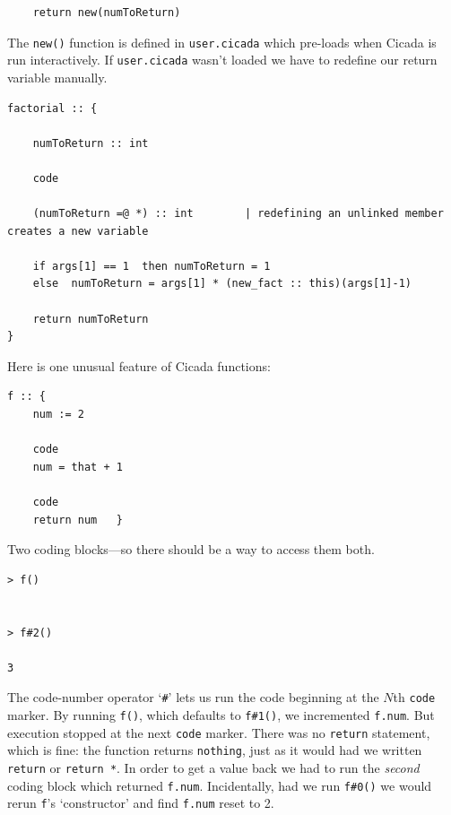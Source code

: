 \documentclass{article}
\newenvironment{code}{
       \begin{list}{}{
               \setlength{\leftmargin}{.4in}
               \setlength{\rightmargin}{0in}
               \setlength{\topsep}{.2in}
       }
       \small
       \item[] }
       { \end{list}   }
\begin{document}
\begin{code} \begin{verbatim}
    return new(numToReturn)
\end{verbatim} \end{code}

\noindent The \verb#new()# function is defined in \verb#user.cicada# which pre-loads when Cicada is run interactively.  If \verb#user.cicada# wasn't loaded we have to redefine our return variable manually.

\begin{code} \begin{verbatim}
factorial :: {
    
    numToReturn :: int
    
    code
    
    (numToReturn =@ *) :: int        | redefining an unlinked member creates a new variable
    
    if args[1] == 1  then numToReturn = 1
    else  numToReturn = args[1] * (new_fact :: this)(args[1]-1)
    
    return numToReturn
}
\end{verbatim} \end{code}

Here is one unusual feature of Cicada functions:

\begin{code} \begin{verbatim}
f :: {
    num := 2
    
    code
    num = that + 1
    
    code
    return num   }
\end{verbatim} \end{code}

\noindent Two coding blocks---so there should be a way to access them both.

\begin{code} \begin{verbatim}
> f()


> f#2()

3
\end{verbatim} \end{code}

\noindent The code-number operator `\verb$#$' lets us run the code beginning at the $N$th \verb#code# marker.  By running \verb$f()$, which defaults to \verb$f#1()$, we incremented \verb#f.num#.  But execution stopped at the next \verb#code# marker.  There was no \verb#return# statement, which is fine:  the function returns \verb#nothing#, just as it would had we written \verb#return# or \verb#return *#.  In order to get a value back we had to run the \emph{second} coding block which returned \verb#f.num#.  Incidentally, had we run \verb$f#0()$ we would rerun \verb#f#'s `constructor' and find \verb#f.num# reset to 2.
\end{document}
